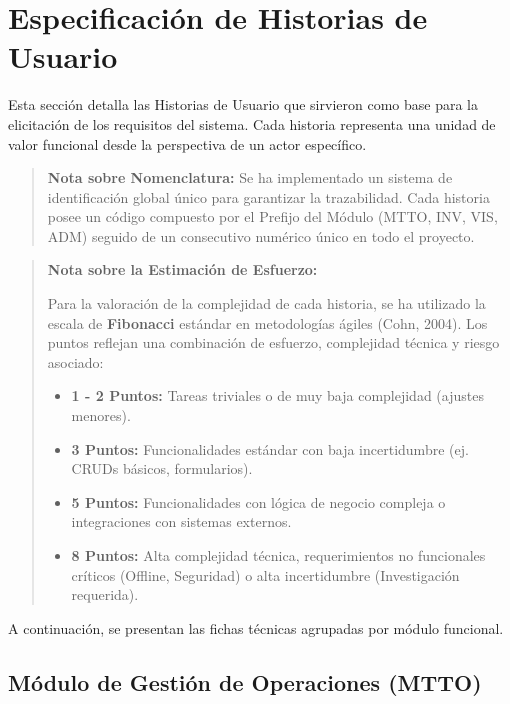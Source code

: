 \section{Especificación de Historias de Usuario}

Esta sección detalla las Historias de Usuario que sirvieron como base para la elicitación de los requisitos del sistema. Cada historia representa una unidad de valor funcional desde la perspectiva de un actor específico.

\begin{quote}
\textbf{Nota sobre Nomenclatura:} Se ha implementado un sistema de identificación global único para garantizar la trazabilidad. Cada historia posee un código compuesto por el Prefijo del Módulo (MTTO, INV, VIS, ADM) seguido de un consecutivo numérico único en todo el proyecto.
\end{quote}

\begin{quote}
\textbf{Nota sobre la Estimación de Esfuerzo:}

Para la valoración de la complejidad de cada historia, se ha utilizado la escala de \textbf{Fibonacci} estándar en metodologías ágiles (Cohn, 2004). Los puntos reflejan una combinación de esfuerzo, complejidad técnica y riesgo asociado:

\begin{itemize}
    \item \textbf{1 - 2 Puntos:} Tareas triviales o de muy baja complejidad (ajustes menores).
    \item \textbf{3 Puntos:} Funcionalidades estándar con baja incertidumbre (ej. CRUDs básicos, formularios).
    \item \textbf{5 Puntos:} Funcionalidades con lógica de negocio compleja o integraciones con sistemas externos.
    \item \textbf{8 Puntos:} Alta complejidad técnica, requerimientos no funcionales críticos (Offline, Seguridad) o alta incertidumbre (Investigación requerida).
\end{itemize}
\end{quote}

A continuación, se presentan las fichas técnicas agrupadas por módulo funcional.

\subsection{Módulo de Gestión de Operaciones (MTTO)}


